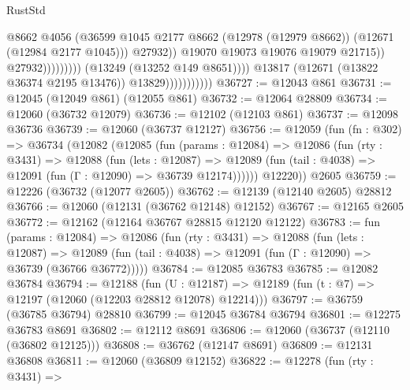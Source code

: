 \begin{lexlean}{RustStd}
\begin{coremodule}
                                                        @8662
                                                        @4056
                                                        (@36599
                                                          @1045
                                                          @2177
                                                          @8662
                                                          (@12978 (@12979 @8662))
                                                          (@12671 (@12984 @2177 @1045)))
                                                        @27932))
                                                    @19070
                                                    @19073
                                                    @19076
                                                    @19079
                                                    @21715))
                                                @27932)))))))))
                              (@13249 (@13252 @149 @8651))))
                          @13817
                          (@12671 (@13822 @36374 @2195 @13476))
                          @13829)))))))))))
@36727 := @12043 @861
@36731 := @12045 (@12049 @861) (@12055 @861)
@36732 := @12064 @28809
@36734 := @12060 (@36732 @12079)
@36736 := @12102 (@12103 @861)
@36737 := @12098 @36736
@36739 := @12060 (@36737 @12127)
@36756 := @12059
    (fun (fn : @302) =>
    @36734
      (@12082
        (@12085
          (fun (params : @12084) =>
          @12086
            (fun (rty : @3431) =>
            @12088
              (fun (lets : @12087) =>
              @12089 (fun (tail : @4038) => @12091 (fun (Γ : @12090) => @36739 @12174))))))
        @12220))
    @2605
@36759 := @12226 (@36732 (@12077 @2605))
@36762 := @12139 (@12140 @2605) @28812
@36766 := @12060 (@12131 (@36762 @12148) @12152)
@36767 := @12165 @2605
@36772 := @12162 (@12164 @36767 @28815 @12120 @12122)
@36783 := fun (params : @12084) =>
  @12086
    (fun (rty : @3431) =>
    @12088
      (fun (lets : @12087) =>
      @12089 (fun (tail : @4038) => @12091 (fun (Γ : @12090) => @36739 (@36766 @36772)))))
@36784 := @12085 @36783
@36785 := @12082 @36784
@36794 := @12188
    (fun (U : @12187) => @12189 (fun (t : @7) => @12197 (@12060 (@12203 @28812 @12078) @12214)))
@36797 := @36759 (@36785 @36794) @28810
@36799 := @12045 @36784 @36794
@36801 := @12275 @36783 @8691
@36802 := @12112 @8691
@36806 := @12060 (@36737 (@12110 (@36802 @12125)))
@36808 := @36762 (@12147 @8691)
@36809 := @12131 @36808
@36811 := @12060 (@36809 @12152)
@36822 := @12278
    (fun (rty : @3431) =>

\end{coremodule}
\end{lexlean}
